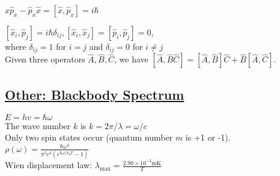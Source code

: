     $\widehat{x} \widehat{p}_x - \widehat{p}_x \widehat{x} = [\widehat{x}, \widehat{p}_x] = i \hbar$

    $[\widehat{x}_i, \widehat{p}_j ] = i \hbar \delta_{ij}, [\widehat{x}_i, \widehat{x}_j] = [\widehat{p}_i, \widehat{p}_j] = 0$, \\ where $\delta_{ij} = 1$ for $i=j$ and $\delta_{ij} = 0$ for $i \neq j$ \\

Given three operators $\widehat{A}, \widehat{B}, \widehat{C}$, we have $[\widehat{A}, \widehat{B}\widehat{C}] = [\widehat{A}, \widehat{B}] \widehat{C} + \widehat{B} [\widehat{A}, \widehat{C}]$.

\subsection{\underline{Other: Blackbody Spectrum}}
$E = hv = \hbar \omega$ \\
The wave number $k$ is $k = 2 \pi / \lambda = \omega / c$ \\
Only two spin states occur (quantum number $m$ is +1 or -1). \\

$\rho(\omega) = \frac{\hbar \omega^3}{\pi^2 c^3 (e^{\hbar \omega / {k_b T}} - 1)}$ \\
Wien displacement law: $\lambda_{\text{max}} = \frac{2.90 \times 10^{-3} \text{mK}}{T}$ \\

